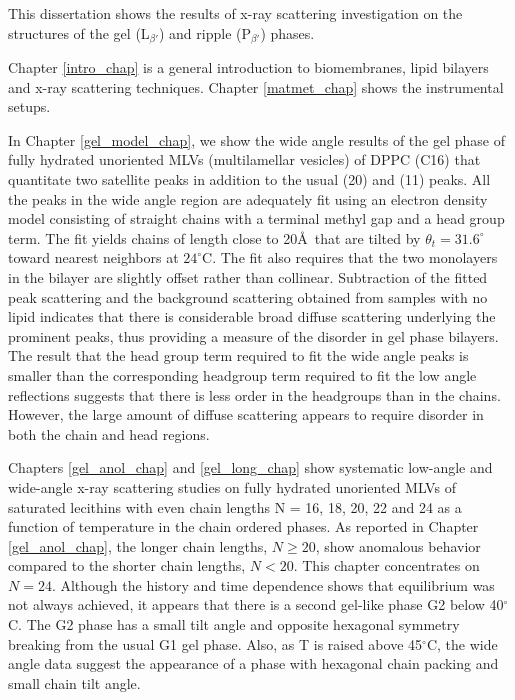 This dissertation shows the results of x-ray scattering investigation on
the structures of the gel (L$_{\beta '}$) and ripple (P$_{\beta '}$)
phases.

Chapter \ref{intro_chap} is a general introduction to biomembranes,
lipid bilayers and x-ray scattering techniques. Chapter \ref{matmet_chap} 
shows the instrumental setups.

In Chapter \ref{gel_model_chap}, we show
the wide angle results of the gel phase of fully hydrated unoriented 
MLVs (multilamellar vesicles) of DPPC (C16) that quantitate
two satellite peaks in addition to the usual (20) and (11) peaks.
All the peaks in the wide angle region are adequately fit using an
electron density model consisting of straight chains with a terminal methyl
gap and a head group term.  The fit yields chains of length close to 
20\AA \ that are tilted by ${\theta}_{t}=31.6^{\circ}$ toward nearest 
neighbors at $24^{\circ}$C. The fit also requires that the two monolayers 
in the bilayer are slightly offset rather than collinear.  Subtraction of the 
fitted peak scattering and
the background scattering obtained from samples with no
lipid indicates that there is considerable broad diffuse scattering 
underlying the prominent peaks, thus providing a measure of the disorder
in gel phase bilayers.  The result that the head group term required
to fit the wide angle peaks is smaller 
than the corresponding headgroup term required to fit the low angle
reflections suggests that there is less order in the headgroups than
in the chains.  However, the large amount of diffuse scattering appears
to require disorder in both the chain and head regions.

Chapters \ref{gel_anol_chap} and \ref{gel_long_chap} show systematic 
low-angle and wide-angle x-ray scattering studies on fully hydrated 
unoriented MLVs of saturated lecithins with even chain 
lengths N = 16, 18, 20, 22 and 24 as
a function of temperature in the chain ordered phases. 
As reported in Chapter \ref{gel_anol_chap}, the longer chain lengths, 
$N \geq 20$, show anomalous behavior compared to the shorter chain lengths,
$N< 20$.  This chapter concentrates on $N = 24$.  Although the history
and time dependence shows that equilibrium was not always achieved, it
appears that there is a second gel-like phase G2
below 40$^{\circ}$C.  The G2 phase has a small tilt angle
and opposite hexagonal symmetry breaking from the usual G1 gel phase.
Also, as T is raised above 45$^{\circ}$C, the wide angle data suggest
the appearance of a phase with hexagonal chain packing and small chain 
tilt angle.

